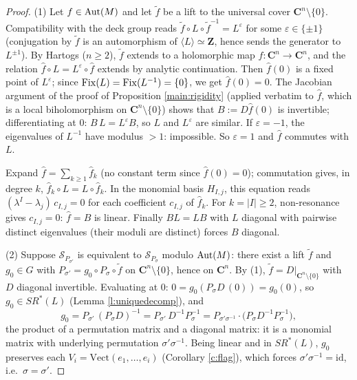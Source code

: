 \documentclass[english,11pt]{amsart}
\theoremstyle{definition}
\theoremstyle{remark}
\numberwithin{equation}{section}
\newcommand{\eps}{\varepsilon}
\newcommand{\Z}{\mathbf{Z}}
\newcommand{\C}{\mathbf{C}}
\newcommand{\Aut}{\mathop{\rm Aut}}
\newcommand{\Fix}{\mathop{\rm Fix}}
\newcommand{\Sc}{\mathcal{S}}
\begin{document}
\begin{proof}
(1) Let $f\in\Aut(M)$ and let $\widetilde f$ be a lift to the universal cover $\C^n\setminus\{0\}$. Compatibility with the deck group reads $\widetilde f\circ L\circ\widetilde f^{-1}=L^{\eps}$ for some $\eps\in\{\pm1\}$ (conjugation by $\widetilde f$ is an automorphism of $\langle L\rangle\simeq\Z$, hence sends the generator to $L^{\pm1}$). By Hartogs ($n\ge2$), $\widetilde f$ extends to a holomorphic map $\widehat f:\C^n\to\C^n$, and the relation $\widehat f\circ L=L^{\eps}\circ\widehat f$ extends by analytic continuation. Then $\widehat f(0)$ is a fixed point of $L^{\eps}$; since $\Fix(L)=\Fix(L^{-1})=\{0\}$, we get $\widehat f(0)=0$. The Jacobian argument of the proof of Proposition \ref{main:rigidity} (applied verbatim to $\widehat f$, which is a local biholomorphism on $\C^n\setminus\{0\}$) shows that $B:=D\widehat f(0)$ is invertible; differentiating at $0$: $B\,L=L^{\eps}B$, so $L$ and $L^{\eps}$ are similar. If $\eps=-1$, the eigenvalues of $L^{-1}$ have modulus $>1$: impossible. So $\eps=1$ and $\widehat f$ commutes with $L$.

Expand $\widehat f=\sum_{k\ge1}\widehat f_k$ (no constant term since $\widehat f(0)=0$); commutation gives, in degree $k$, $\widehat f_k\circ L=L\circ\widehat f_k$. In the monomial basis $H_{I,j}$, this equation reads $(\lambda^{I}-\lambda_j)\,c_{I,j}=0$ for each coefficient $c_{I,j}$ of $\widehat f_k$. For $k=|I|\ge2$, non-resonance gives $c_{I,j}=0$: $\widehat f=B$ is linear. Finally $BL=LB$ with $L$ diagonal with pairwise distinct eigenvalues (their moduli are distinct) forces $B$ diagonal.

(2) Suppose $\Sc_{P_{\sigma'}}$ is equivalent to $\Sc_{P_\sigma}$ modulo $\Aut(M)$: there exist a lift $\widetilde f$ and $g_0\in G$ with $P_{\sigma'}=g_0\circ P_\sigma\circ\widetilde f$ on $\C^n\setminus\{0\}$, hence on $\C^n$. By (1), $\widetilde f=D|_{\C^n\setminus\{0\}}$ with $D$ diagonal invertible. Evaluating at $0$: $0=g_0(P_\sigma D\,(0))=g_0(0)$, so $g_0\in SR^*(L)$ (Lemma \ref{l:uniquedecomp}), and
\[
g_0=P_{\sigma'}\,(P_\sigma D)^{-1}=P_{\sigma'}\,D^{-1}P_\sigma^{-1}=P_{\sigma'\sigma^{-1}}\cdot\big(P_\sigma D^{-1}P_\sigma^{-1}\big),
\]
the product of a permutation matrix and a diagonal matrix: it is a monomial matrix with underlying permutation $\sigma'\sigma^{-1}$. Being linear and in $SR^*(L)$, $g_0$ preserves each $V_i=\mathrm{Vect}(e_1,\dots,e_i)$ (Corollary \ref{c:flag}), which forces $\sigma'\sigma^{-1}=\mathrm{id}$, i.e.\ $\sigma=\sigma'$.
\end{proof}
\end{document}
